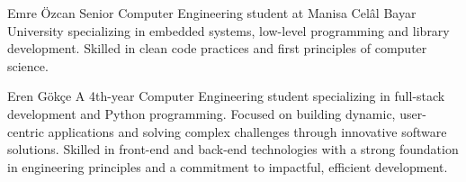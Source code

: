 \documentclass[a4paper,journal]{IEEEtran}
\begin{document}
%

\begin{IEEEbiography}{Emre Özcan}
Senior Computer Engineering student at Manisa Celâl Bayar University
specializing in embedded systems, low-level programming and library development.
Skilled in clean code practices and first principles of computer science.
\end{IEEEbiography}

\begin{IEEEbiography}{Eren Gökçe}
A 4th-year Computer Engineering student specializing in full-stack development
and Python programming.
Focused on building dynamic, user-centric applications and solving complex
challenges through innovative software
solutions.
Skilled in front-end and back-end technologies with a strong foundation in
engineering principles and a commitment to
impactful, efficient development.
\end{IEEEbiography}
\end{document}
